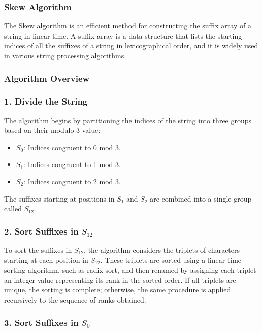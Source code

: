 \subsubsection{Skew Algorithm}
The Skew algorithm is an efficient method for constructing the suffix array of a string in linear time. A suffix array is a data structure that lists the starting indices of all the suffixes of a string in lexicographical order, and it is widely used in various string processing algorithms.

\subsubsection*{Algorithm Overview}

\subsubsection*{1. Divide the String}

The algorithm begins by partitioning the indices of the string into three groups based on their modulo 3 value:
\begin{itemize}
    \item $S_0$: Indices congruent to 0 mod 3.
    \item $S_1$: Indices congruent to 1 mod 3.
    \item $S_2$: Indices congruent to 2 mod 3.
\end{itemize}

The suffixes starting at positions in $S_1$ and $S_2$ are combined into a single group called $S_{12}$.

\subsubsection*{2. Sort Suffixes in $S_{12}$}

To sort the suffixes in $S_{12}$, the algorithm considers the triplets of characters starting at each position in $S_{12}$. These triplets are sorted using a linear-time sorting algorithm, such as radix sort, and then renamed by assigning each triplet an integer value representing its rank in the sorted order. If all triplets are unique, the sorting is complete; otherwise, the same procedure is applied recursively to the sequence of ranks obtained.

\subsubsection*{3. Sort Suffixes in $S_0$}

